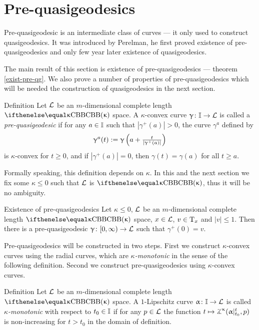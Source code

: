 \section{Pre-quasigeodesics}
\label{sec:pqg}

Pre-quasigeodesic is an  intermediate class of curves --- it only used to construct quasigeodesics.
It was introduced by Perelman, 
he first proved existence of pre-quasigeodesics 
and only few year later existence of quasigeodesics.

The main result of this section is existence of pre-quasigeodesics --- theorem \ref{exist-pre-qg}.
We also prove a number of properties of pre-quasigeodesics which will be needed the construction of quasigeodesics in the next section.

\begin{thm}{Definition}\label{def:pqg}
Let  $\mathcal{L}$ be an $m$-dimensional complete length $\Alex{\kappa}$ space.
A $\kappa$-convex curve $\gamma\:\II \to \spc{L}$ is called a \emph{pre-quasigeodesic} if for
any $a\in \II$ such that ${|\gamma^+(a)|}>0$, the curve $\gamma^a$ defined by
\[\upgamma^a(t)
:=
\upgamma\left(a+\tfrac{t}{|\upgamma^+(a)|}\right)\]
is $\kappa$-convex for $t\ge0$, and if ${|\gamma^+(a)|}=0$, then $\gamma(t)=\gamma(a)$ for
all $t\ge a$.
\end{thm}

Formally speaking, this definition depends on $\kappa$.
In this and the next section we fix some $\kappa\le 0$ such that $\mathcal{L}$ is $\Alex\kappa$, thus it will be no ambiguity.


\begin{thm}{Existence of pre-quasigeodesics}\label{exist-pre-qg}
Let $\kappa\le 0$, 
$\mathcal{L}$ be an $m$-dimensional complete length $\Alex{\kappa}$ space, 
$x\in \spc{L}$,
$v\in \T_x$ and $|v|\le 1$. 
Then there is a pre-quasigeodesic $\gamma\:[0,\infty)\to \spc{L}$ such that
 $\gamma^+(0)=v$.
\end{thm}

Pre-quasigeodesics will be constructed in two steps. 
First we construct $\kappa$-convex curves using the radial curves, which are \emph{$\kappa$-monotonic} in the sense of the following definition.
Second we construct pre-quasigeodesics using $\kappa$-convex curves.

\begin{thm}{Definition}\label{def:mono}
Let $\mathcal{L}$ be an $m$-dimensional complete length $\Alex\kappa$ space.
A $1$-Lipschitz curve $\alpha\:\II\to \spc{L}$ is called \emph{$\kappa$-monotonic} with
respect to $t_0\in\II$ if for any $p\in \spc{L}$ the function $t\mapsto\tangle\mc\kappa(\alpha|_{t_0}^t,p)$
is non-increasing for $t>t_0$ in the domain of definition. 
\end{thm}


